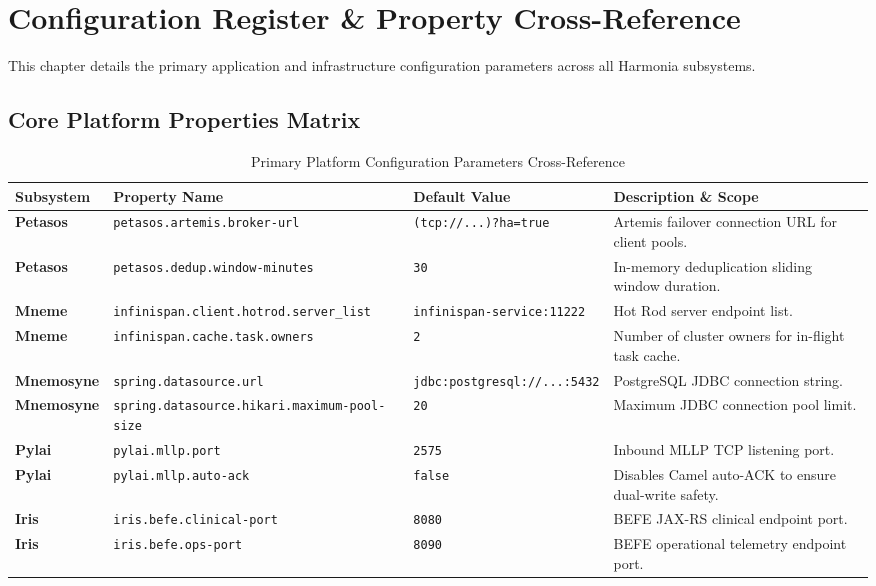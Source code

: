 
\chapter{Configuration Register \& Property Cross-Reference}
\label{chap:configuration_properties}

This chapter details the primary application and infrastructure configuration parameters across all Harmonia subsystems.

\section{Core Platform Properties Matrix}

\begin{table}[htbp]
\centering
\small
\begin{tabularx}{\textwidth}{l P{4.2cm} P{3.2cm} Y}
\toprule
\textbf{Subsystem} & \textbf{Property Name} & \textbf{Default Value} & \textbf{Description \& Scope} \\
\midrule
\textbf{Petasos} & \nolinkurl{petasos.artemis.broker-url} & \nolinkurl{(tcp://...)?ha=true} & Artemis failover connection URL for client pools. \\
\textbf{Petasos} & \nolinkurl{petasos.dedup.window-minutes} & \nolinkurl{30} & In-memory deduplication sliding window duration. \\
\textbf{Mneme} & \nolinkurl{infinispan.client.hotrod.server_list} & \nolinkurl{infinispan-service:11222} & Hot Rod server endpoint list. \\
\textbf{Mneme} & \nolinkurl{infinispan.cache.task.owners} & \nolinkurl{2} & Number of cluster owners for in-flight task cache. \\
\textbf{Mnemosyne} & \nolinkurl{spring.datasource.url} & \nolinkurl{jdbc:postgresql://...:5432} & PostgreSQL JDBC connection string. \\
\textbf{Mnemosyne} & \nolinkurl{spring.datasource.hikari.maximum-pool-size} & \nolinkurl{20} & Maximum JDBC connection pool limit. \\
\textbf{Pylai} & \nolinkurl{pylai.mllp.port} & \nolinkurl{2575} & Inbound MLLP TCP listening port. \\
\textbf{Pylai} & \nolinkurl{pylai.mllp.auto-ack} & \nolinkurl{false} & Disables Camel auto-ACK to ensure dual-write safety. \\
\textbf{Iris} & \nolinkurl{iris.befe.clinical-port} & \nolinkurl{8080} & BEFE JAX-RS clinical endpoint port. \\
\textbf{Iris} & \nolinkurl{iris.befe.ops-port} & \nolinkurl{8090} & BEFE operational telemetry endpoint port. \\
\bottomrule
\end{tabularx}
\caption{Primary Platform Configuration Parameters Cross-Reference}
\label{tab:config_properties_summary}
\end{table}

\newpage
